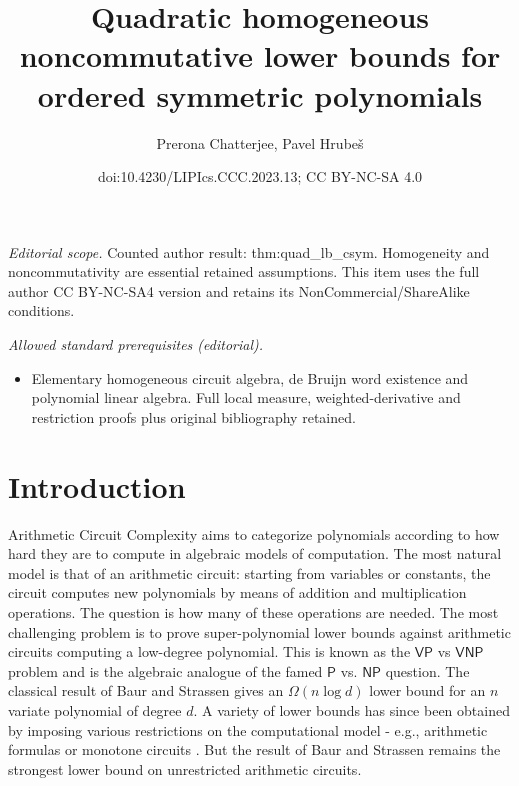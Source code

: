 \documentclass[10pt,a4paper]{article}
\title{Quadratic homogeneous noncommutative lower bounds for ordered symmetric polynomials}
\author{Prerona Chatterjee, Pavel Hrubeš}
\date{doi:10.4230/LIPIcs.CCC.2023.13; CC BY-NC-SA 4.0}
\def\VP{\mathsf{VP}}
\def\VNP{\mathsf{VNP}}
\def\P{\mathsf{P}}
\def\NP{\mathsf{NP}}
\newcommand{\an}[1]{\textcolor{red}{#1}}
\begin{document}
\maketitle
\noindent\textit{Editorial scope.} Counted author result: thm:quad\_lb\_csym. Homogeneity and noncommutativity are essential retained assumptions. This item uses the full author CC BY-NC-SA4 version and retains its NonCommercial/ShareAlike conditions.\par\medskip
\noindent\textit{Allowed standard prerequisites (editorial).}\begin{itemize}
\item Elementary homogeneous circuit algebra, de Bruijn word existence and polynomial linear algebra. Full local measure, weighted-derivative and restriction proofs plus original bibliography retained.
\end{itemize}\medskip
\section{Introduction}


Arithmetic Circuit Complexity aims to categorize  polynomials according to how hard they are to compute in  algebraic models of computation.
The most natural model is that of an arithmetic circuit: starting from variables or constants, the circuit computes new polynomials by means of addition and multiplication operations. 
The question is how many of these operations are needed. The most challenging problem is to prove super-polynomial lower bounds against arithmetic circuits computing a low-degree polynomial.
This is known as the $\VP$ vs $\VNP$ problem and is the algebraic analogue of the famed $\P$ vs. $\NP$ question.  
The classical result of Baur and Strassen \cite{Str73, BS83} gives an $\Omega(n\log d)$ lower bound for an $n$ variate polynomial of degree $d$. 
A variety of lower bounds has since been obtained by imposing various restrictions on the computational model - e.g., arithmetic formulas or monotone circuits \cite{Kal85, Val80}. 
But the result of Baur and Strassen remains the strongest lower bound on unrestricted arithmetic circuits. 
\end{document}
